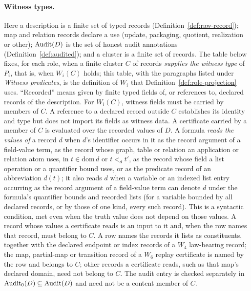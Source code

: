 \paragraph{Witness types.} Here a description is a finite set of typed
records (Definition~\ref{def:raw-record}); map and relation records declare a
use (update, packaging, quotient, realization or other); \(\operatorname{Audit}\!\left(D\right)\) is the
set of honest audit annotations (Definition~\ref{def:audited}); and a cluster
is a finite set of records. The table below fixes, for each role, when a
finite cluster \(C\) of records \emph{supplies the witness type} of \(P_i\),
that is, when \(W_i(C)\) holds; this table, with the paragraphs listed under \emph{Witness predicates}, is the definition of \(W_i\) that Definition~\ref{def:role-projection} uses. ``Recorded'' means
given by finite typed fields of, or references to, declared records of the
description. For \(W_i(C)\), witness fields must be carried by members of
\(C\). A reference to a declared record outside \(C\) establishes its identity
and type but does not import its fields as witness data. A certificate
carried by a member of \(C\) is evaluated over the recorded values of \(D\). A formula \emph{reads the values of} a record \(d\) when \(d\)'s identifier occurs in it as the record argument of a field-value term, as the record whose graph, table or relation an application or relation atom uses, in \(t\in\mathrm{dom}\,d\) or \(t<_d t'\), as the record whose field a list operation or a quantifier bound uses, or as the predicate record of an abbreviation \(d(t)\); it also reads \(d\) when a variable or an indexed list entry occurring as the record argument of a field-value term can denote \(d\) under the formula's quantifier bounds and recorded lists (for a variable bounded by all declared records, or by those of one kind, every such record). This is a syntactic condition, met even when the truth value does not depend on those values. A
record whose values a certificate reads is an input to it and, when the row names that
record, must belong to \(C\). A row names the records it lists as
constituents, together with the declared endpoint or index records of a
\(W_4\) law-bearing record; the map, partial-map or transition record of a \(W_6\) replay certificate is named by the row and belongs to \(C\); other records a certificate reads, such as that map's
declared domain, need not belong to
\(C\). The \Psix{} audit
entry is checked separately in \(\mathrm{Audit}_0(D)\subseteq\operatorname{Audit}\!\left(D\right)\) and need not be a content member
of \(C\).

